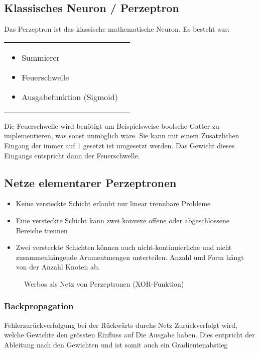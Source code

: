 \subsection{Klassisches Neuron / Perzeptron}
Das Perzeptron ist das klassische mathematische Neuron. Es besteht aus:\\
\begin{tabularx}{\textwidth}{XX}
	\vspace{-1.5cm}
	\begin{itemize}
		\item Summierer
		\item Feuerschwelle
		\item Ausgabefunktion (Sigmoid)
	\end{itemize} &
	
\end{tabularx}

Die Feuerschwelle wird benötigt um Beispielsweise boolsche Gatter zu
implementieren, was sonst unmöglich wäre.  Sie kann mit einem Zusätzlichen
Eingang der immer auf 1 gesetzt ist umgesetzt werden.  Das Gewicht dieses
Eingangs entspricht dann der Feuerschwelle.

\subsection{Netze elementarer Perzeptronen}
\begin{itemize}
	\item Keine versteckte Schicht erlaubt nur linear trennbare Probleme
	\item Eine versteckte Schicht kann zwei konvexe offene oder abgeschlossene Bereiche trennen
	\item Zwei versteckte Schichten können auch nicht-kontinuierliche und nicht zusammenhängende
		Arumentmengen unterteilen. Anzahl und Form hängt von der Anzahl Knoten ab.
\end{itemize}
\begin{figure}[h!]
	\centering
	
	\caption{Werbos als Netz von Perzeptronen (XOR-Funktion)}
\end{figure}

\subsubsection{Backpropagation}
Fehlerzurückverfolgung bei der Rückwärts durchs Netz Zurückverfolgt wird,
welche Gewichte den grössten Einfluss auf Die Ausgabe haben.
Dies entpricht der Ableitung nach den Gewichten und ist somit auch ein
Gradientenabstieg 

